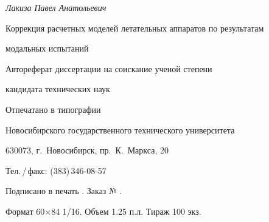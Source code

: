 
\newpage
\thispagestyle{empty}

\vspace*{0pt plus1fill}

\small
\begin{center}
    \textit{Лакиза Павел Анатольевич}
    \par\smallskip

    Коррекция расчетных моделей летательных аппаратов 
    по результатам \par модальных испытаний
    \par\smallskip

    Автореферат диссертации на соискание ученой степени \par
    кандидата технических наук
    \par\medskip
    
    Отпечатано в типографии \par
    Новосибирского государственного технического университета \par   
    630073, г.~Новосибирск, пр.~К.~Маркса, 20 \par
    Тел.\,/\,факс: (383)\,346-08-57
    \par\smallskip

    Подписано в печать . Заказ № . \par
    Формат 60$\times$84 1/16. Объем 1.25 п.л. Тираж 100 экз.
\end{center}